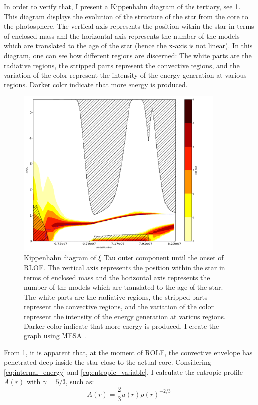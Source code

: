 In order to verify that, I present a Kippenhahn diagram of the tertiary, see \cref{fig:kippen_plot}. This diagram displays the evolution of the structure of the star from the core to the photosphere. The vertical axis represents the position within the star in terms of enclosed mass and the horizontal axis represents the number of the models which are translated to the age of the star (hence the x-axis is not linear). In this diagram, one can see how different regions are discerned: The white parts are the radiative regions, the stripped parts represent the convective regions, and the variation of the color represent the
intensity of the energy generation at various regions. Darker color indicate that more energy is produced.
\begin{figure}[H]
    \centering
    \includegraphics[width=0.9\textwidth]{Thesis/graphs/jpg2pdf.pdf}
    \caption{Kippenhahn diagram of $\xi$ Tau outer component until the onset of RLOF. The vertical axis represents the position within the star in terms of enclosed mass and the horizontal axis represents the number of the models which are translated to the age of the star. The white parts are the radiative regions, the stripped parts represent the convective regions, and the variation of the color represent the intensity of the energy generation at various regions. Darker color indicate that more energy is produced. I create the graph using MESA \citep{paxton2010modules,paxton2013modules,paxton2015modules,paxton2019modules}.}
    \label{fig:kippen_plot}
\end{figure}

From \cref{fig:kippen_plot}, it is apparent that, at the moment of ROLF, the convective envelope has penetrated deep inside the star close to the actual core. Considering \eqref{eq:internal_energy} and \eqref{eq:entropic_variable}, I calculate the entropic profile $A(r)$ with $\gamma = 5/3$, such as:
\begin{equation}\label{eq:entropic_variable_2}
    A(r) = \frac{2}{3} u(r) \rho(r)^{-2/3}
\end{equation}



